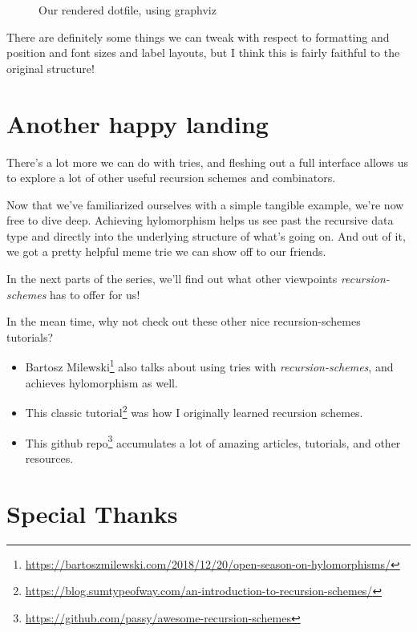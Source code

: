\documentclass[]{article}
\renewcommand{\href}[2]{#2\footnote{\url{#1}}}
\begin{document}
\begin{figure}
\centering
{}
\caption{Our rendered dotfile, using graphviz}
\end{figure}

There are definitely some things we can tweak with respect to formatting and
position and font sizes and label layouts, but I think this is fairly faithful
to the original structure!

\section{Another happy landing}\label{another-happy-landing}

There's a lot more we can do with tries, and fleshing out a full interface
allows us to explore a lot of other useful recursion schemes and combinators.

Now that we've familiarized ourselves with a simple tangible example, we're now
free to dive deep. Achieving hylomorphism helps us see past the recursive data
type and directly into the underlying structure of what's going on. And out of
it, we got a pretty helpful meme trie we can show off to our friends.

In the next parts of the series, we'll find out what other viewpoints
\emph{recursion-schemes} has to offer for us!

In the mean time, why not check out these other nice recursion-schemes
tutorials?

\begin{itemize}
\tightlist
\item
  \href{https://bartoszmilewski.com/2018/12/20/open-season-on-hylomorphisms/}{Bartosz
  Milewski} also talks about using tries with \emph{recursion-schemes}, and
  achieves hylomorphism as well.
\item
  \href{https://blog.sumtypeofway.com/an-introduction-to-recursion-schemes/}{This
  classic tutorial} was how I originally learned recursion schemes.
\item
  \href{https://github.com/passy/awesome-recursion-schemes}{This github repo}
  accumulates a lot of amazing articles, tutorials, and other resources.
\end{itemize}

\section{Special Thanks}\label{special-thanks}
\end{document}
